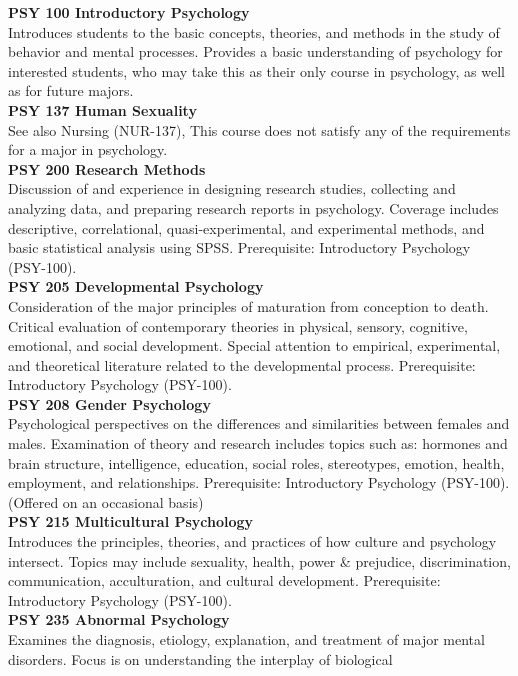 \documentclass[
  letterpaper,
]{scrbook}
\begin{document}
\textbf{PSY 100 Introductory Psychology}\\
Introduces students to the basic concepts, theories, and methods in the
study of behavior and mental processes. Provides a basic understanding
of psychology for interested students, who may take this as their only
course in psychology, as well as for future majors.\\
\textbf{PSY 137 Human Sexuality}\\
See also Nursing (NUR-137), This course does not satisfy any of the
requirements for a major in psychology.\\
\textbf{PSY 200 Research Methods}\\
Discussion of and experience in designing research studies, collecting
and analyzing data, and preparing research reports in psychology.
Coverage includes descriptive, correlational, quasi-experimental, and
experimental methods, and basic statistical analysis using SPSS.
Prerequisite: Introductory Psychology (PSY-100).\\
\textbf{PSY 205 Developmental Psychology}\\
Consideration of the major principles of maturation from conception to
death. Critical evaluation of contemporary theories in physical,
sensory, cognitive, emotional, and social development. Special attention
to empirical, experimental, and theoretical literature related to the
developmental process. Prerequisite: Introductory Psychology
(PSY-100).\\
\textbf{PSY 208 Gender Psychology}\\
Psychological perspectives on the differences and similarities between
females and males. Examination of theory and research includes topics
such as: hormones and brain structure, intelligence, education, social
roles, stereotypes, emotion, health, employment, and relationships.
Prerequisite: Introductory Psychology (PSY-100). (Offered on an
occasional basis)\\
\textbf{PSY 215 Multicultural Psychology}\\
Introduces the principles, theories, and practices of how culture and
psychology intersect. Topics may include sexuality, health, power \&
prejudice, discrimination, communication, acculturation, and cultural
development. Prerequisite: Introductory Psychology (PSY-100).\\
\textbf{PSY 235 Abnormal Psychology}\\
Examines the diagnosis, etiology, explanation, and treatment of major
mental disorders. Focus is on understanding the interplay of biological
\end{document}
